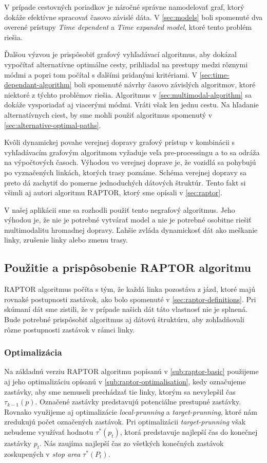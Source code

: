 V prípade cestovných poriadkov je náročné správne namodelovať graf, ktorý dokáže efektívne spracovať časovo závislé dáta. V \ref{sec:models} boli spomenuté dva overené prístupy \textit{Time dependent} a \textit{Time expanded model}, ktoré tento problém riešia. 

Ďalšou výzvou je prispôsobiť grafový vyhľadávací algoritmus, aby dokázal vypočítať alternatívne optimálne cesty, prihliadal na prestupy medzi rôznymi módmi a popri tom počítal s ďalšími pridanými kritériami.
V \ref{sec:time-dependant-algorithm} boli spomenuté návrhy časovo závislých algoritmov, ktoré niektoré z týchto problémov riešia. Algoritmus v \ref{sec:multimodal-algorithm} sa dokáže vysporiadať aj viacerými módmi. Vráti však len jednu cestu. Na hľadanie alternatívnych ciest, by sme mohli použiť algoritmus spomenutý v \ref{sec:alternative-optimal-paths}.

Kvôli dynamickej povahe verejnej dopravy grafový prístup v kombinácii s vyhľadávacím grafovým algoritmom vyžaduje veľa pre-processingu a to sa odráža na výpočtových časoch. Výhodou vo verejnej doprave je, že vozidlá sa pohybujú po vyznačených linkách, ktorých trasy poznáme. Schéma verejnej dopravy sa preto dá zachytiť do pomerne jednoduchých dátových štruktúr. Tento fakt si všimli aj autori algoritmu RAPTOR, ktorý sme opísali v \ref{sec:raptor}. 

V našej aplikácii sme sa rozhodli použiť tento negrafový algoritmus. Jeho výhodou je, že nie je potrebné vytvárať model a nie je potrebné osobitne riešiť multimodalitu hromadnej dopravy. Ľahšie zvláda dynamickosť dát ako meškanie linky, zrušenie linky alebo zmenu trasy. 

\subsection{Použitie a prispôsobenie RAPTOR algoritmu}
RAPTOR algoritmus počíta s tým, že každá linka pozostáva z jázd, ktoré majú rovnaké postupnosti zastávok, ako bolo spomenuté v \ref{sec:raptor-definitions}. Pri skúmaní dát sme zistili, že v prípade našich dát táto vlastnosť nie je splnená. Bude potrebné prispôsobiť algoritmus aj dátovú štruktúru, aby zohľadňovali rôzne postupnosti zastávok v rámci linky.

\subsubsection{Optimalizácia}
Na základnú verziu RAPTOR algoritmu popísanú v \ref{sub:raptor-basic} použijeme aj jeho optimalizáciu opísanú v \ref{sub:raptor-optimalisation}, kedy označujeme zastávky, aby sme nemuseli prechádzať tie linky, ktorým sa nevylepšil čas $\tau_{k-1}(p)$. Označené zastávky predstavujú potenciálne prestupné zastávky.  Rovnako využijeme aj optimalizácie \textit{local-prunning} a \textit{target-prunning}, ktoré nám zredukujú počet označených zastávok. Pri optimalizácii \textit{target-prunning} však nebudeme využívať hodnotu $\tau^*(p_t)$, ktorá predstavuje najlepší čas do konečnej zastávky $p_t$. Nás zaujíma najlepší čas zo všetkých konečných zastávok zoskupených v \textit{stop area} $\tau^*(P_t)$. 

